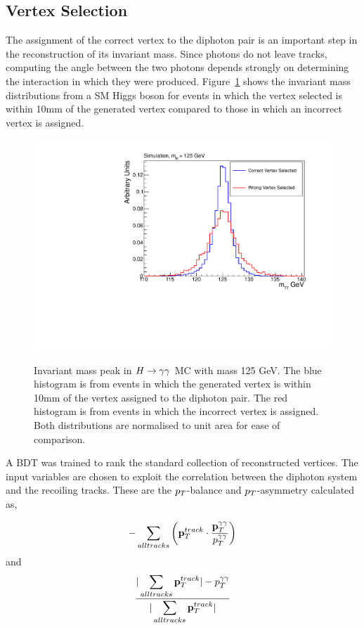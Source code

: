 \subsection{Vertex Selection}
\label{sec:vertexselection}

The assignment of the correct vertex to the diphoton pair is an important step in the reconstruction of 
its invariant mass. Since photons do not leave tracks, computing the angle between the two photons 
depends strongly on determining the interaction in which they were produced.
Figure~\ref{fig:higgsrightwrongvertex} shows the invariant mass distributions from a SM
Higgs boson for events in which the vertex selected is within 10mm of the generated vertex
compared to those in which an incorrect vertex is assigned. 

\begin{figure}
\begin{center}
\includegraphics[width=.8\textwidth]{hgg7TeV/generalPlots/rightwrongvtxpeak.pdf}
\label{fig:higgsrightwrongvertex}
\caption{Invariant mass peak in $H\rightarrow\gamma\gamma$ MC with mass 125 GeV. The blue histogram is from events in which 
the generated vertex is within 10mm of the vertex assigned to the diphoton pair. The red histogram is 
from events in which the incorrect vertex is assigned. Both distributions are normalised to unit area for
ease of comparison.}
\end{center}
\end{figure} 

A BDT was trained to rank the standard collection of reconstructed vertices.
The input variables are chosen to exploit the correlation between the diphoton system and the recoiling tracks.
These are the $p_{T}$-balance and $p_{T}$-asymmetry calculated as,

\begin{eqnarray}
	-\sum_{all tracks} \left(\mathbf{p}_{T}^{track}\cdot \frac{\displaystyle \mathbf{p}_{T}^{\gamma\gamma}}{\displaystyle p_{T}^{\gamma\gamma}}\right) 
\end{eqnarray}
and
\begin{eqnarray}
	\frac{\displaystyle |\sum_{all tracks} \mathbf{p}_{T}^{track}| - p_{T}^{\gamma\gamma} }{ \displaystyle|\sum_{all tracks} \mathbf{p}_{T}^{track}|} 
\end{eqnarray}

